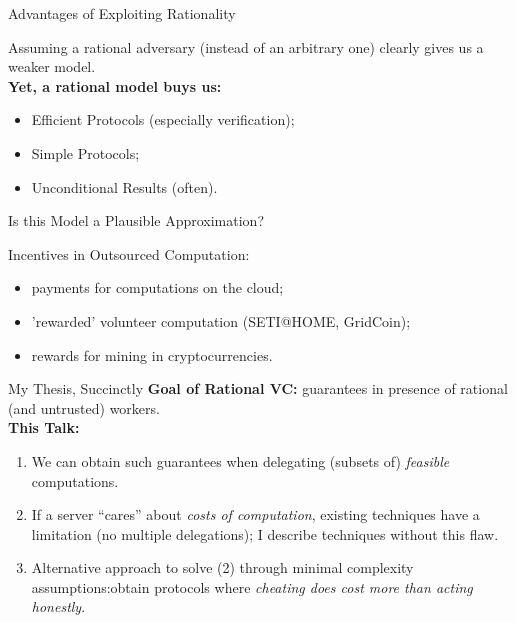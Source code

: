 \begin{frame}[t]{Advantages of Exploiting Rationality}

Assuming a rational adversary (instead of an arbitrary one) clearly gives us a weaker model.\\\vspace{1cm}
\pause
\textbf{Yet, a rational model buys us:}
\begin{itemize}
	\item Efficient Protocols (especially verification);
	\item Simple Protocols;
	\item  Unconditional Results (often).
\end{itemize}

\end{frame}

\begin{frame}{Is this Model a Plausible Approximation?}
\begin{block}{Incentives in Outsourced Computation:}
	\begin{itemize}
		\item  payments for computations on the cloud; %
		\item 'rewarded' volunteer computation (SETI@HOME, GridCoin);
		\item  rewards for mining in cryptocurrencies.
	\end{itemize}
\end{block}
\end{frame}



\begin{frame}[t]{My Thesis, Succinctly}
	\textbf{Goal of Rational VC:} guarantees in presence of rational (and untrusted) workers.\\\vspace{0.9cm} \pause
	\textbf{This Talk:}\\
	\begin{enumerate}
		\item We can obtain such guarantees when delegating (subsets of) \textit{feasible} computations.\pause %
		\item If a server ``cares'' about \textit{costs of computation}, existing techniques have a limitation (no multiple delegations); \pause I describe techniques without this flaw.\pause
		\item Alternative approach to solve (2) through minimal complexity assumptions:\pause  obtain protocols where \textit{cheating does cost more than acting honestly}.
	\end{enumerate}
\end{frame}

